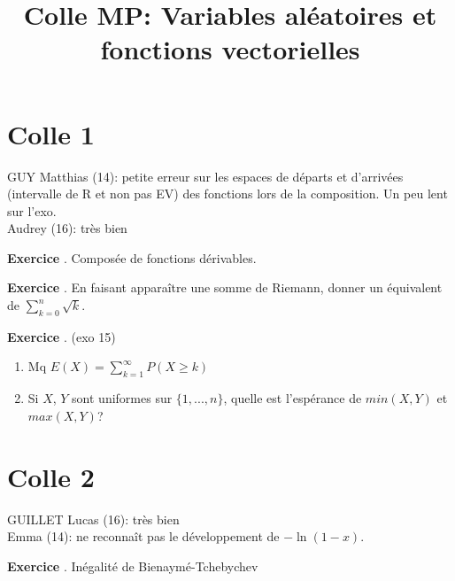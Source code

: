 \documentclass[10pt,a4paper]{article}
\title{Colle MP: Variables aléatoires et fonctions vectorielles}
\newcounter{question}
\newcounter{exo}
\newenvironment{exo}{\vspace{0.5cm}\setcounter{question}{0}\addtocounter{exo}{1} \noindent \textbf{Exercice \theexo}. \normalsize }{\par}
\begin{document}
	\maketitle
	
	\section*{Colle 1}
	GUY Matthias (14): petite erreur sur les espaces de départs et d'arrivées (intervalle de R et non pas EV) des fonctions lors de la composition. Un peu lent sur l'exo.\\
	Audrey (16): très bien\\

	\begin{exo}
		Composée de fonctions dérivables.
	\end{exo}

	\begin{exo}
		En faisant apparaître une somme de Riemann, donner un équivalent de $\sum_{k=0}^{n} \sqrt{k}$.
	\end{exo}

	\begin{exo} (exo 15)
		\begin{enumerate}
			\item Mq $E(X) = \sum_{k=1}^\infty P(X \geq k)$
			\item Si $X$, $Y$ sont uniformes sur $\lbrace 1,..., n \rbrace$, quelle est l'espérance de $min(X, Y)$ et $max(X, Y)$?
		\end{enumerate}
	\end{exo}	
	

	\section*{Colle 2}
	\setcounter{exo}{0}
	GUILLET Lucas (16): très bien\\
	Emma (14): ne reconnaît pas le développement de $-\ln(1-x)$. 
	\begin{exo}
		Inégalité de Bienaymé-Tchebychev
	\end{exo}
	
\end{document}
